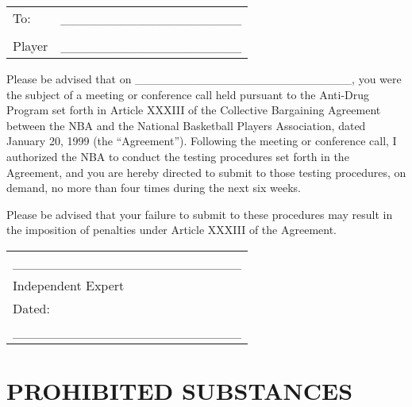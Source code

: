 \documentclass[
]{book}
\begin{document}
\begin{longtable}[]{@{}lc@{}}
\toprule()
\endhead
To: & \_\_\_\_\_\_\_\_\_\_\_\_\_\_\_\_\_\_\_ \\
& \\
Player & \_\_\_\_\_\_\_\_\_\_\_\_\_\_\_\_\_\_\_ \\
\bottomrule()
\end{longtable}

Please be advised that on \_\_\_\_\_\_\_\_\_\_\_\_\_\_\_\_\_\_\_\_\_\_\_\_\_\_, you were the subject of a meeting or conference call held pursuant to the Anti-Drug Program set forth in Article XXXIII of the Collective Bargaining Agreement between the NBA and the National Basketball Players Association, dated January 20, 1999 (the ``Agreement''). Following the meeting or conference call, I authorized the NBA to conduct the testing procedures set forth in the Agreement, and you are hereby directed to submit to those testing procedures, on demand, no more than four times during the next six weeks.

Please be advised that your failure to submit to these procedures may result in the imposition of penalties under Article XXXIII of the Agreement.

\begin{longtable}[]{@{}l@{}}
\toprule()
\endhead
\_\_\_\_\_\_\_\_\_\_\_\_\_\_\_\_\_\_\_\_\_\_\_\_ \\
Independent Expert \\
Dated: \\
\_\_\_\_\_\_\_\_\_\_\_\_\_\_\_\_\_\_\_\_\_\_\_\_ \\
\bottomrule()
\end{longtable}

\hypertarget{prohibited-substances}{%
\section{PROHIBITED SUBSTANCES}\label{prohibited-substances}}
\end{document}
